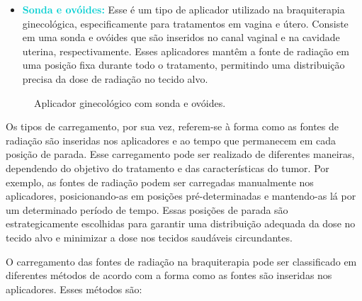 \documentclass[11pt,a4paper]{article}
\newcounter{exemplo}
\begin{document}
\begin{enumerate}
					\begin{itemize}[label=\textcolor{CarnationPink}{$\star$}]
						\item \textcolor{DarkTurquoise}{\textbf{Sonda e ovóides:}} Esse é um tipo de aplicador utilizado na braquiterapia ginecológica, especificamente para tratamentos em vagina e útero. Consiste em uma sonda e ovóides que são inseridos no canal vaginal e na cavidade uterina, respectivamente. Esses aplicadores mantêm a fonte de radiação em uma posição fixa durante todo o tratamento, permitindo uma distribuição precisa da dose de radiação no tecido alvo.
					\end{itemize}
					\begin{figure}[h]
						\centering
						\caption{Aplicador ginecológico com sonda e ovóides.}
						\label{img:aplicadorSondaEOvoides}
					\end{figure}
			\end{enumerate}
				

			Os tipos de carregamento, por sua vez, referem-se à forma como as fontes de radiação são inseridas nos aplicadores e ao tempo que permanecem em cada posição de parada. Esse carregamento pode ser realizado de diferentes maneiras, dependendo do objetivo do tratamento e das características do tumor. Por exemplo, as fontes de radiação podem ser carregadas manualmente nos aplicadores, posicionando-as em posições pré-determinadas e mantendo-as lá por um determinado período de tempo. Essas posições de parada são estrategicamente escolhidas para garantir uma distribuição adequada da dose no tecido alvo e minimizar a dose nos tecidos saudáveis circundantes.

			O carregamento das fontes de radiação na braquiterapia pode ser classificado em diferentes métodos de acordo com a forma como as fontes são inseridas nos aplicadores. Esses métodos são:
\end{document}
